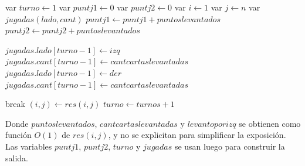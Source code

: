 \begin{algorithmic}
\State var $turno \leftarrow 1$
\State var $puntj1 \leftarrow 0$
\State var $puntj2 \leftarrow 0$
\State var $i \leftarrow 1$
\State var $j \leftarrow n$
\State var $jugadas(lado,cant)$
\Loop
		\State $puntj1 \leftarrow puntj1 + puntoslevantados$
	\Else
		\State $puntj2 \leftarrow puntj2 + puntoslevantados$ 
	\EndIf

		\State $jugadas.lado[turno-1] \leftarrow izq$
		\State $jugadas.cant[turno-1] \leftarrow cantcartaslevantadas$
	\Else
		\State $jugadas.lado[turno-1] \leftarrow der$
		\State $jugadas.cant[turno-1] \leftarrow cantcartaslevantadas$
	\EndIf
	
		\State break
	\EndIf
	\State $(i,j) \leftarrow res(i,j)$
	\State $turno \leftarrow turnos+1$
\EndLoop
\end{algorithmic}
Donde $puntoslevantados$, $cantcartaslevantadas$ y $levantoporizq$ se obtienen como funci\'on $O(1)$ de $res(i,j)$, y no se explicitan para simplificar la exposici\'on. Las variables $puntj1$, $puntj2$, $turno$ y $jugadas$ se usan luego para construir la salida.

